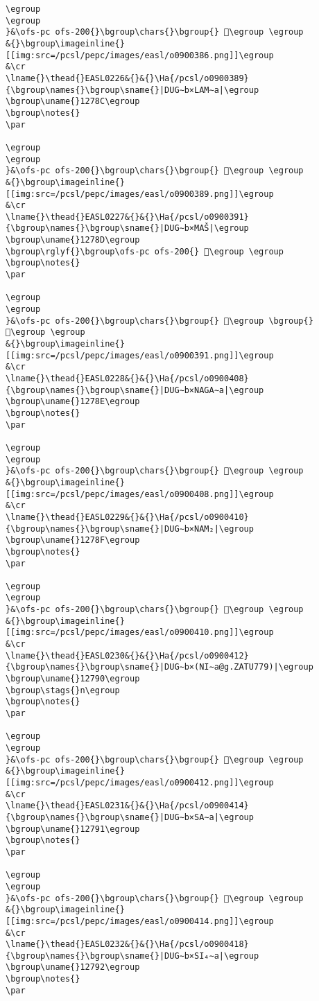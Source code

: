 \begin{verbatim}
\egroup
\egroup
}&\ofs-pc ofs-200{}\bgroup\chars{}\bgroup{} 𒞋\egroup \egroup
&{}\bgroup\imageinline{}[[img:src=/pcsl/pepc/images/easl/o0900386.png]]\egroup
&\cr
\lname{}\thead{}EASL0226&{}&{}\Ha{/pcsl/o0900389}{\bgroup\names{}\bgroup\sname{}|DUG∼b×LAM∼a|\egroup
\bgroup\uname{}1278C\egroup
\bgroup\notes{}
\par 

\egroup
\egroup
}&\ofs-pc ofs-200{}\bgroup\chars{}\bgroup{} 𒞌\egroup \egroup
&{}\bgroup\imageinline{}[[img:src=/pcsl/pepc/images/easl/o0900389.png]]\egroup
&\cr
\lname{}\thead{}EASL0227&{}&{}\Ha{/pcsl/o0900391}{\bgroup\names{}\bgroup\sname{}|DUG∼b×MAŠ|\egroup
\bgroup\uname{}1278D\egroup
\bgroup\rglyf{}\bgroup\ofs-pc ofs-200{} 𒞍\egroup \egroup
\bgroup\notes{}
\par 

\egroup
\egroup
}&\ofs-pc ofs-200{}\bgroup\chars{}\bgroup{} 𒞳\egroup \bgroup{} 𒞍\egroup \egroup
&{}\bgroup\imageinline{}[[img:src=/pcsl/pepc/images/easl/o0900391.png]]\egroup
&\cr
\lname{}\thead{}EASL0228&{}&{}\Ha{/pcsl/o0900408}{\bgroup\names{}\bgroup\sname{}|DUG∼b×NAGA∼a|\egroup
\bgroup\uname{}1278E\egroup
\bgroup\notes{}
\par 

\egroup
\egroup
}&\ofs-pc ofs-200{}\bgroup\chars{}\bgroup{} 𒞎\egroup \egroup
&{}\bgroup\imageinline{}[[img:src=/pcsl/pepc/images/easl/o0900408.png]]\egroup
&\cr
\lname{}\thead{}EASL0229&{}&{}\Ha{/pcsl/o0900410}{\bgroup\names{}\bgroup\sname{}|DUG∼b×NAM₂|\egroup
\bgroup\uname{}1278F\egroup
\bgroup\notes{}
\par 

\egroup
\egroup
}&\ofs-pc ofs-200{}\bgroup\chars{}\bgroup{} 𒞏\egroup \egroup
&{}\bgroup\imageinline{}[[img:src=/pcsl/pepc/images/easl/o0900410.png]]\egroup
&\cr
\lname{}\thead{}EASL0230&{}&{}\Ha{/pcsl/o0900412}{\bgroup\names{}\bgroup\sname{}|DUG∼b×(NI∼a@g.ZATU779)|\egroup
\bgroup\uname{}12790\egroup
\bgroup\stags{}n\egroup
\bgroup\notes{}
\par 

\egroup
\egroup
}&\ofs-pc ofs-200{}\bgroup\chars{}\bgroup{} 𒞐\egroup \egroup
&{}\bgroup\imageinline{}[[img:src=/pcsl/pepc/images/easl/o0900412.png]]\egroup
&\cr
\lname{}\thead{}EASL0231&{}&{}\Ha{/pcsl/o0900414}{\bgroup\names{}\bgroup\sname{}|DUG∼b×SA∼a|\egroup
\bgroup\uname{}12791\egroup
\bgroup\notes{}
\par 

\egroup
\egroup
}&\ofs-pc ofs-200{}\bgroup\chars{}\bgroup{} 𒞑\egroup \egroup
&{}\bgroup\imageinline{}[[img:src=/pcsl/pepc/images/easl/o0900414.png]]\egroup
&\cr
\lname{}\thead{}EASL0232&{}&{}\Ha{/pcsl/o0900418}{\bgroup\names{}\bgroup\sname{}|DUG∼b×SI₄∼a|\egroup
\bgroup\uname{}12792\egroup
\bgroup\notes{}
\par 


\end{verbatim}
